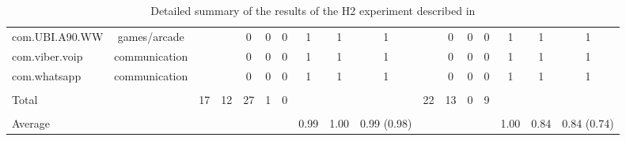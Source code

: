 \begin{table*}
\begin{small}
\begin{center}
{\begin{tabular}{|l|c|c||c|c|c|c|c|c|c||c|c|c|c|c|c|c|}
com.UBI.A90.WW       &       games/arcade       &            &            &      0      &      0      &      0      &      1      &      1      &      1      &            &      0      &      0      &      0      &      1      &      1      &      1      \\
com.viber.voip       &       communication       &            &            &      0      &      0      &      0      &      1      &      1      &      1      &            &      0      &      0      &      0      &      1      &      1      &      1      \\
com.whatsapp         &       communication       &            &            &      0      &      0      &      0      &      1      &      1      &      1      &            &      0      &      0      &      0      &      1      &      1      &      1      \\
\hline
\hline
 & & & & & & & & & & & & & & & &\\[-0.10in]
Total                &             &      17      &      12      &      27      &      1      &      0      &                 &                 &                 &      22      &      13      &      0      &      9      &                 &                 &                 \\
\hline
 & & & & & & & & & & & & & & & &\\[-0.10in]
Average              &             &              &              &              &         	  &             &      0.99      &      1.00      &      0.99 (0.98)      &              &              &             &             &      1.00     &      0.84      &      0.84 (0.74)      \\
\hline
\end{tabular}
}%
\end{center}
\caption{\label{Ta:realworldAll}Detailed summary of the results of the H2 experiment described in }
\end{small}
\end{table*} 


